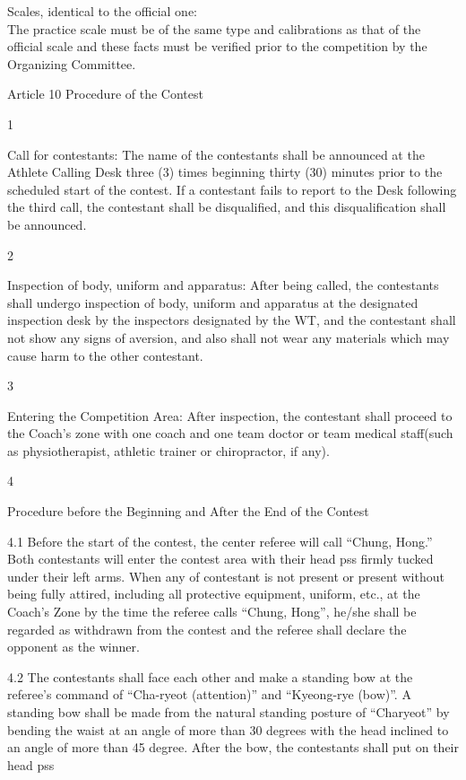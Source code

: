\documentclass[
]{report}
\begin{document}
Scales, identical to the official one:\\
The practice scale must be of the same type and calibrations as that of
the official scale and these facts must be verified prior to the
competition by the Organizing Committee.

Article 10 Procedure of the Contest

1

Call for contestants: The name of the contestants shall be announced at
the Athlete Calling Desk three (3) times beginning thirty (30) minutes
prior to the scheduled start of the contest. If a contestant fails to
report to the Desk following the third call, the contestant shall be
disqualified, and this disqualification shall be announced.

2

Inspection of body, uniform and apparatus: After being called, the
contestants shall undergo inspection of body, uniform and apparatus at
the designated inspection desk by the inspectors designated by the WT,
and the contestant shall not show any signs of aversion, and also shall
not wear any materials which may cause harm to the other contestant.

3

Entering the Competition Area: After inspection, the contestant shall
proceed to the Coach's zone with one coach and one team doctor or team
medical staff(such as physiotherapist, athletic trainer or chiropractor,
if any).

4

Procedure before the Beginning and After the End of the Contest

4.1 Before the start of the contest, the center referee will call
``Chung, Hong.'' Both contestants will enter the contest area with their
head pss firmly tucked under their left arms. When any of contestant is
not present or present without being fully attired, including all
protective equipment, uniform, etc., at the Coach's Zone by the time the
referee calls ``Chung, Hong'', he/she shall be regarded as withdrawn
from the contest and the referee shall declare the opponent as the
winner.

4.2 The contestants shall face each other and make a standing bow at the
referee's command of ``Cha-ryeot (attention)'' and ``Kyeong-rye (bow)''.
A standing bow shall be made from the natural standing posture of
``Charyeot'' by bending the waist at an angle of more than 30 degrees
with the head inclined to an angle of more than 45 degree. After the
bow, the contestants shall put on their head pss
\end{document}
